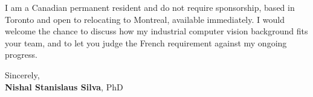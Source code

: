 \documentclass[11pt]{article}
\newcommand{\clName}{Nishal Stanislaus Silva}
\begin{document}
I am a Canadian permanent resident and do not require sponsorship, based in Toronto and open to relocating to Montreal, available immediately. I would welcome the chance to discuss how my industrial computer vision background fits your team, and to let you judge the French requirement against my ongoing progress.

\vspace{12pt}
Sincerely,\\[2pt]
\textbf{\clName}, PhD
\end{document}
